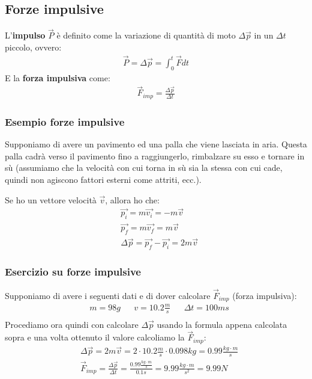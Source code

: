   \subsection{Forze impulsive}
    L'\textbf{impulso} $\vec{P}$ è definito come la variazione di quantità di moto $\Delta\vec{p}$ in un $\Delta t$ piccolo, ovvero:
    \begin{align*}
      \vec{P}=\Delta\vec{p}=\int_0^t{\vec{F}dt}
    \end{align*}
    E la \textbf{forza impulsiva} come:
    \begin{align*}
      \vec{F}_{imp}=\frac{\Delta\vec{p}}{\Delta t}
    \end{align*}

    \subsubsection{Esempio forze impulsive}
      Supponiamo di avere un pavimento ed una palla che viene lasciata in aria. Questa palla cadrà verso il pavimento fino a raggiungerlo, rimbalzare su esso e tornare in sù (assumiamo che la velocità con cui torna in sù sia la stessa con cui cade, quindi non agiscono fattori esterni come attriti, ecc.).


      Se ho un vettore velocità $\vec{v}$, allora ho che:
      \begin{align*}
        &\vec{p_i}=m\vec{v_i}=-m\vec{v}\\
        &\vec{p_f}=m\vec{v_f}=m\vec{v}\\
        &\Delta\vec{p}=\vec{p_f}-\vec{p_i}=2m\vec{v}
      \end{align*}

    \subsubsection{Esercizio su forze impulsive}
      Supponiamo di avere i seguenti dati e di dover calcolare $\vec{F}_{imp}$ (forza impulsiva):
      \begin{align*}
        &m=98g&&v=10.2\frac{m}{s}&&\Delta t=100ms\\
      \end{align*}
      Procediamo ora quindi con calcolare $\Delta\vec{p}$ usando la formula appena calcolata sopra e una volta ottenuto il valore calcoliamo la $\vec{F}_{imp}$:
      \begin{align*}
        &\Delta\vec{p}=2m\vec{v}=2\cdot 10.2\frac{m}{s}\cdot 0.098kg=0.99\frac{kg\cdot m}{s}\\
        &\vec{F}_{imp}=\frac{\Delta\vec{p}}{\Delta t}=\frac{0.99\frac{kg\cdot m}{s}}{0.1s}=9.99\frac{kg\cdot m}{s^2}=9.99N
      \end{align*}


